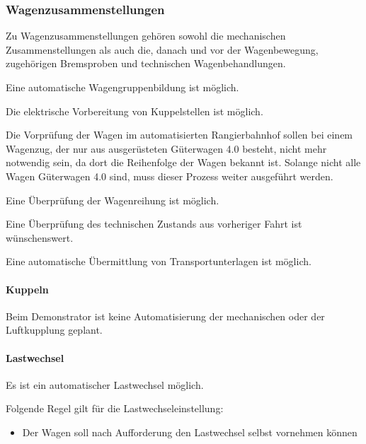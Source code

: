 \subsubsection{Wagenzusammenstellungen}
Zu Wagenzusammenstellungen gehören sowohl die mechanischen Zusammenstellungen als auch die, danach und vor der Wagenbewegung, zugehörigen Bremsproben und technischen Wagenbehandlungen.
\begin{feat}
Eine automatische Wagengruppenbildung ist möglich.
\end{feat}
\begin{feat}
Die elektrische Vorbereitung von Kuppelstellen ist möglich.
\end{feat}
Die Vorprüfung der Wagen im automatisierten Rangierbahnhof sollen bei einem Wagenzug, der nur aus ausgerüsteten Güterwagen 4.0 besteht, nicht mehr notwendig sein, da dort die Reihenfolge der Wagen bekannt ist. Solange nicht alle Wagen Güterwagen 4.0 sind, muss dieser Prozess weiter ausgeführt werden.
\begin{feat}
Eine Überprüfung der Wagenreihung ist möglich.
\end{feat}
\begin{feat}
Eine Überprüfung des technischen Zustands aus vorheriger Fahrt ist wünschenswert.
\end{feat}
\begin{feat}
Eine automatische Übermittlung von Transportunterlagen ist möglich.
\end{feat}

\paragraph{Kuppeln}
Beim Demonstrator ist keine Automatisierung der mechanischen oder der Luftkupplung geplant.

\paragraph{Lastwechsel}
\begin{feat}
Es ist ein automatischer Lastwechsel möglich.
\end{feat}
\begin{rem} [zu Anf. 27]
Folgende Regel gilt für die Lastwechseleinstellung:
\begin{itemize}
    \item Der Wagen soll nach Aufforderung den Lastwechsel selbst vornehmen können
\end{itemize}
\end{rem}

